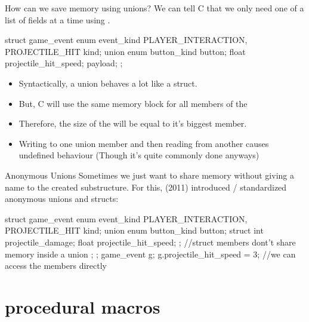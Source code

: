\documentclass[10pt,graphics,aspectratio=169,table]{beamer}
\begin{document}
\begin{frame}[fragile]{How can we save memory using unions?}
    We can tell C that we only need one of a list of fields at a 
    time using .

    \begin{codeblock}
struct game_event{
    enum event_kind {PLAYER_INTERACTION, PROJECTILE_HIT} kind;
    union {
        enum button_kind button;    
        float projectile_hit_speed; 
    } payload;
};
    \end{codeblock}
    \begin{itemize}
        \item Syntactically, a union behaves a lot like a struct.
        \item But, C will use the same memory block for all members
        of the 
        \item Therefore, the size of the  will 
        be equal to it's biggest member.
        \item Writing to one union member and then reading from another causes
            undefined behaviour (Though it's quite commonly done anyways)
    \end{itemize}
\end{frame}

\begin{frame}[fragile]{Anonymous Unions}
    Sometimes we just want to share memory without giving a name to the 
    created substructure. For this,  (2011) introduced / standardized 
    anonymous unions and structs:

    \begin{codeblock}
struct game_event{
    enum event_kind {PLAYER_INTERACTION, PROJECTILE_HIT} kind;
    union {
        enum button_kind button;    
        struct {
            int projectile_damage; 
            float projectile_hit_speed; 
        }; //struct members dont't share memory inside a union
    };
};
game_event g;
g.projectile_hit_speed = 3; //we can access the members directly
    \end{codeblock}
\end{frame}


\section{procedural macros}
\end{document}
